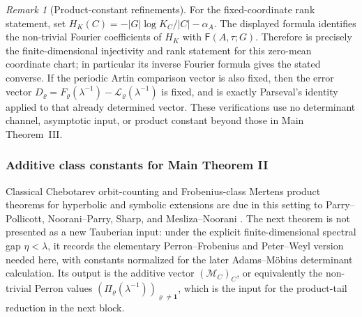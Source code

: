 \documentclass[11pt,a4paper]{amsart}
\theoremstyle{plain}
\theoremstyle{definition}
\theoremstyle{remark}
\newtheorem{remark}[theorem]{Remark}
\begin{document}
\begin{remark}[Product-constant refinements]
  For the fixed-coordinate rank statement, set
  \(H_K(C)=-|G|\log K_C/|C|-\alpha_A\).  The displayed formula identifies the
  non-trivial Fourier coefficients of \(H_K\) with
  \(\mathsf F(A,\tau;G)\).  Therefore
   is precisely the
  finite-dimensional injectivity and rank statement for this zero-mean
  coordinate chart; in particular its inverse Fourier formula gives the stated
  converse.  If the periodic Artin comparison vector is also fixed, then the
  error vector
  \(D_\varrho=F_\varrho(\lambda^{-1})-
  \mathcal L_\varrho(\lambda^{-1})\) is fixed, and
   is exactly Parseval's identity applied to
  that already determined vector.  These verifications use no determinant channel, asymptotic input, or product
constant beyond those in Main Theorem~III.
\end{remark}
\subsubsection{Additive class constants for Main Theorem II}

Classical Chebotarev orbit-counting and Frobenius-class Mertens product
theorems for hyperbolic and symbolic extensions are due in this setting to
Parry--Pollicott, Noorani--Parry, Sharp, and Mesliza--Noorani
\cite{ParryPollicott1986Chebotarev,NooraniParry1992ChebotarevShifts,Sharp1991Mertens,MeslizaNoorani1999FrobeniusMertens}.  The next theorem is
not presented as a new Tauberian input: under the explicit finite-dimensional
spectral gap \(\eta<\lambda\), it records the elementary Perron--Frobenius and
Peter--Weyl version needed here, with constants normalized for the later
Adams--M\"obius determinant calculation.
Its output is the additive vector \((\mathcal M_C)_C\), or equivalently the
non-trivial Perron values \((\Pi_\varrho(\lambda^{-1}))_{\varrho\ne\mathbf1}\),
which is the input for the product-tail reduction in the next block.
\end{document}
